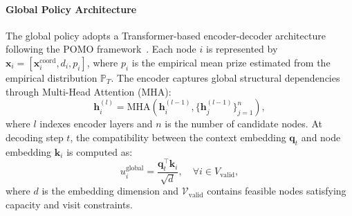 \documentclass[preprint,12pt,authoryear]{elsarticle}
\theoremstyle{definition}
\begin{document}
\paragraph{Global Policy Architecture}
The global policy adopts a Transformer-based encoder-decoder architecture following the POMO framework~\citep{kwon2020pomo}. Each node $i$ is represented by $\mathbf{x}_i = [\mathbf{x}_i^{\text{coord}}, d_i, p_i]$, where $p_i$ is the empirical mean prize estimated from the empirical distribution $\mathbb{P}_T$. The encoder captures global structural dependencies through Multi-Head Attention (MHA):
\begin{equation}
\mathbf{h}_i^{(l)} = \text{MHA}\left(\mathbf{h}_i^{(l-1)}, \{\mathbf{h}_j^{(l-1)}\}_{j=1}^n\right),
\end{equation}
where $l$ indexes encoder layers and $n$ is the number of candidate nodes. At decoding step $t$, the compatibility between the context embedding $\mathbf{q}_t$ and node embedding $\mathbf{k}_i$ is computed as:
\begin{equation}
u_i^{\text{global}} = \frac{\mathbf{q}_t^{\top} \mathbf{k}_i}{\sqrt{d}}, \quad \forall i \in V_{\text{valid}},
\end{equation}
where $d$ is the embedding dimension and $\mathcal{V}_{\text{valid}}$ contains feasible nodes satisfying capacity and visit constraints.
\end{document}
